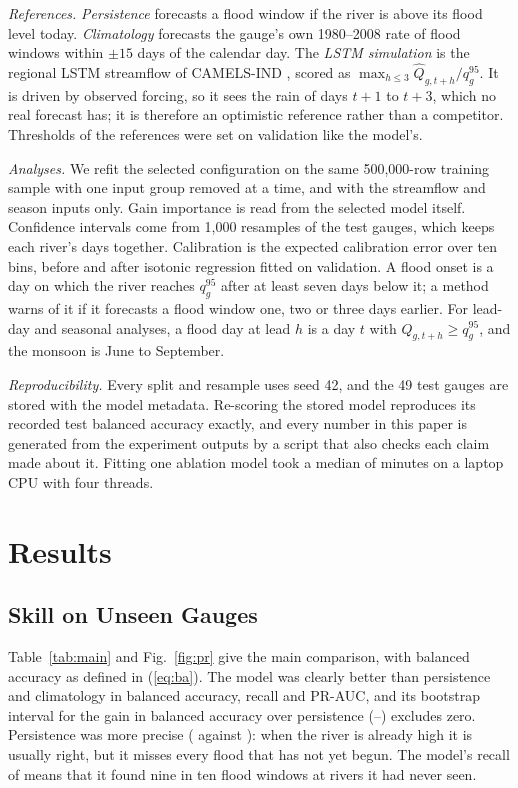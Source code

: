 \documentclass[conference]{IEEEtran}
\begin{document}
\textit{References.} \emph{Persistence} forecasts a flood window if the river is above its flood level today. \emph{Climatology} forecasts the gauge's own 1980--2008 rate of flood windows within $\pm15$ days of the calendar day. The \emph{LSTM simulation} is the regional LSTM streamflow of CAMELS-IND \cite{Mangukiya2025}, scored as $\max_{h\le3}\hat Q_{g,t+h}/q^{95}_g$. It is driven by observed forcing, so it sees the rain of days $t{+}1$ to $t{+}3$, which no real forecast has; it is therefore an optimistic reference rather than a competitor. Thresholds of the references were set on validation like the model's.

\textit{Analyses.} We refit the selected configuration on the same 500,000-row training sample with one input group removed at a time, and with the streamflow and season inputs only. Gain importance is read from the selected model itself. Confidence intervals come from 1,000 resamples of the test gauges, which keeps each river's days together. Calibration is the expected calibration error over ten bins, before and after isotonic regression fitted on validation. A flood onset is a day on which the river reaches $q^{95}_g$ after at least seven days below it; a method warns of it if it forecasts a flood window one, two or three days earlier. For lead-day and seasonal analyses, a flood day at lead $h$ is a day $t$ with $Q_{g,t+h}\ge q^{95}_g$, and the monsoon is June to September.

\textit{Reproducibility.} Every split and resample uses seed 42, and the 49 test gauges are stored with the model metadata. Re-scoring the stored model reproduces its recorded test balanced accuracy exactly, and every number in this paper is generated from the experiment outputs by a script that also checks each claim made about it. Fitting one ablation model took a median of \AblMinutes{} minutes on a laptop CPU with four threads.

\section{Results}
\subsection{Skill on Unseen Gauges}
Table~\ref{tab:main} and Fig.~\ref{fig:pr} give the main comparison, with balanced accuracy as defined in (\ref{eq:ba}). The model was clearly better than persistence and climatology in balanced accuracy, recall and PR-AUC, and its bootstrap interval for the gain in balanced accuracy over persistence (\DiffPersLo--\DiffPersHi) excludes zero. Persistence was more precise (\PersPrec{} against \XgbPrec): when the river is already high it is usually right, but it misses every flood that has not yet begun. The model's recall of \XgbRec{} means that it found nine in ten flood windows at rivers it had never seen.
\end{document}

